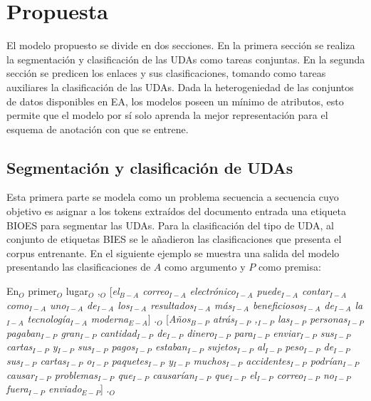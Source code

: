 \chapter{Propuesta}\label{chapter:proposal}

El modelo propuesto se divide en dos secciones. En la primera sección se realiza la segmentación y clasificación de 
las UDAs como tareas conjuntas. En la segunda sección se predicen los enlaces y sus clasificaciones, tomando
como tareas auxiliares la clasificación de las UDAs. Dada la heterogeniedad de las conjuntos de datos disponibles 
en EA, los modelos poseen un mínimo de atributos, esto permite que el modelo por sí solo aprenda 
la mejor representación para el esquema de anotación con que se entrene.

\section{Segmentación y clasificación de UDAs}

Esta primera parte se modela como un problema secuencia a secuencia cuyo objetivo es asignar a los tokens 
extraídos del documento entrada una etiqueta BIOES para segmentar las UDAs. Para la clasificación del tipo 
de UDA, al conjunto de etiquetas BIES se le añadieron las clasificaciones que presenta el corpus entrenante.
En el siguiente ejemplo se muestra una salida del modelo presentando las clasificaciones de
$A$ como argumento y $P$ como premisa:

\begin{adjustwidth}{25pt}{25pt}
    En$_O$ primer$_O$ lugar$_O$ ,$_O$ [\emph{el$_{B-A}$ correo$_{I-A}$ electrónico$_{I-A}$ puede$_{I-A}$ 
    contar$_{I-A}$ como$_{I-A}$ uno$_{I-A}$ de$_{I-A}$ los$_{I-A}$ resultados$_{I-A}$
    más$_{I-A}$ beneficiosos$_{I-A}$ de$_{I-A}$ la$_{I-A}$ tecnología$_{I-A}$ moderna$_{E-A}$}] .$_{O}$ 
    [\emph{Años$_{B-P}$ atrás$_{I-P}$ ,$_{I-P}$ las$_{I-P}$ personas$_{I-P}$ pagaban$_{I-P}$ gran$_{I-P}$ cantidad$_{I-P}$ 
    de$_{I-P}$ dinero$_{I-P}$ para$_{I-P}$ enviar$_{I-P}$ sus$_{I-P}$ cartas$_{I-P}$ y$_{I-P}$ sus$_{I-P}$ 
    pagos$_{I-P}$ estaban$_{I-P}$ sujetos$_{I-P}$ al$_{I-P}$ peso$_{I-P}$ de$_{I-P}$ sus$_{I-P}$ 
    cartas$_{I-P}$ o$_{I-P}$ paquetes$_{I-P}$ y$_{I-P}$ muchos$_{I-P}$ accidentes$_{I-P}$ podrían$_{I-P}$
    causar$_{I-P}$ problemas$_{I-P}$ que$_{I-P}$ causarían$_{I-P}$ que$_{I-P}$ el$_{I-P}$ correo$_{I-P}$ 
    no$_{I-P}$ fuera$_{I-P}$ enviado$_{E-P}$}] .$_{O}$
\end{adjustwidth}

